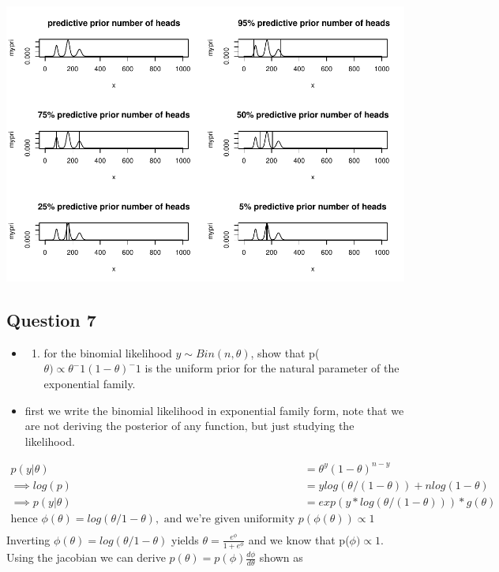 \documentclass[
]{book}
\providecommand{\tightlist}{%
  \setlength{\itemsep}{0pt}\setlength{\parskip}{0pt}}
\theoremstyle{definition}
\theoremstyle{definition}
\theoremstyle{definition}
\theoremstyle{definition}
\theoremstyle{remark}
\begin{document}
\includegraphics{_main_files/figure-latex/unnamed-chunk-14-1.pdf}

\hypertarget{question-7}{%
\subsection*{Question 7}\label{question-7}}

\begin{itemize}
\item
  \begin{enumerate}
  \def\labelenumi{(\alph{enumi})}
  \tightlist
  \item
    for the binomial likelihood \(y\sim Bin(n,\theta)\), show that p(\(\theta)\propto \theta^-1(1-\theta)^-1\) is the uniform prior for the natural parameter of the exponential family.
  \end{enumerate}
\item
  first we write the binomial likelihood in exponential family form, note that we are not deriving the posterior of any function, but just studying the likelihood.
\end{itemize}

\[
\begin{aligned}
p(y|\theta) &= \theta^y(1-\theta)^{n-y}\\
\implies log(p)&= ylog(\theta/(1-\theta))+nlog(1-\theta) \\
\implies p(y|\theta) &= exp(y*log(\theta/(1-\theta)))*g(\theta)\\
\text{hence } \phi(\theta)= log(\theta/1-\theta), \text{  and we're given uniformity  } p(\phi(\theta))\propto 1\\
\end{aligned}
\]
Inverting \(\phi(\theta)=log(\theta/1-\theta)\) yields \(\theta=\frac{e^\phi}{1+e^\phi}\) and we know that p(\(\phi)\propto 1\). Using the jacobian we can derive \(p(\theta)=p(\phi)\frac{d\phi}{d\theta}\) shown as
\end{document}
